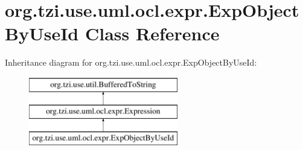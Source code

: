 \hypertarget{classorg_1_1tzi_1_1use_1_1uml_1_1ocl_1_1expr_1_1_exp_object_by_use_id}{\section{org.\-tzi.\-use.\-uml.\-ocl.\-expr.\-Exp\-Object\-By\-Use\-Id Class Reference}
\label{classorg_1_1tzi_1_1use_1_1uml_1_1ocl_1_1expr_1_1_exp_object_by_use_id}
}
Inheritance diagram for org.\-tzi.\-use.\-uml.\-ocl.\-expr.\-Exp\-Object\-By\-Use\-Id\-:\begin{figure}[H]
\begin{center}
\leavevmode
\includegraphics[height=3.000000cm]{classorg_1_1tzi_1_1use_1_1uml_1_1ocl_1_1expr_1_1_exp_object_by_use_id}
\end{center}
\end{figure}
